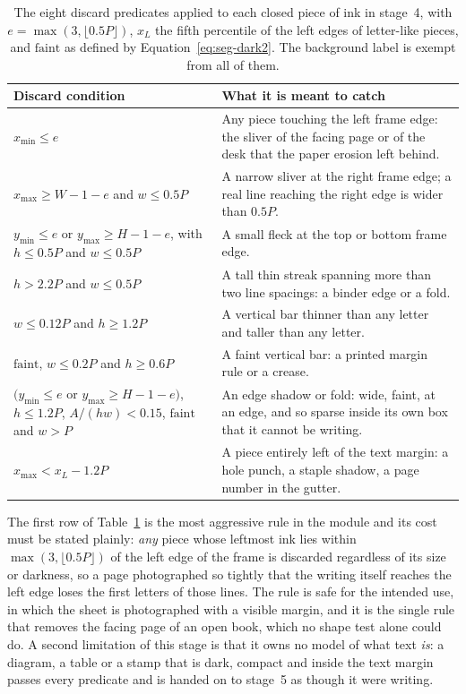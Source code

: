 \begin{table}[h]
\centering
\fontsize{9.5}{11.5}\selectfont
\begin{tabularx}{\linewidth}{|p{3.3cm}|X|}
\hline
\textbf{Discard condition} & \textbf{What it is meant to catch} \\
\hline
$x_{\min}\le e$ & Any piece touching the left frame edge: the sliver of the facing page or of the desk that the paper erosion left behind. \\
\hline
$x_{\max}\ge W-1-e$ and $w\le0.5P$ & A narrow sliver at the right frame edge; a real line reaching the right edge is wider than $0.5P$. \\
\hline
$y_{\min}\le e$ or $y_{\max}\ge H-1-e$, with $h\le0.5P$ and $w\le0.5P$ & A small fleck at the top or bottom frame edge. \\
\hline
$h>2.2P$ and $w\le0.5P$ & A tall thin streak spanning more than two line spacings: a binder edge or a fold. \\
\hline
$w\le0.12P$ and $h\ge1.2P$ & A vertical bar thinner than any letter and taller than any letter. \\
\hline
$\mathrm{faint}$, $w\le0.2P$ and $h\ge0.6P$ & A faint vertical bar: a printed margin rule or a crease. \\
\hline
$(y_{\min}\le e$ or $y_{\max}\ge H-1-e)$, $h\le1.2P$, $A/(hw)<0.15$, $\mathrm{faint}$ and $w>P$ & An edge shadow or fold: wide, faint, at an edge, and so sparse inside its own box that it cannot be writing. \\
\hline
$x_{\max}<x_L-1.2P$ & A piece entirely left of the text margin: a hole punch, a staple shadow, a page number in the gutter. \\
\hline
\end{tabularx}
\caption{The eight discard predicates applied to each closed piece of ink in stage~4, with $e=\max(3,\lfloor0.5P\rfloor)$, $x_L$ the fifth percentile of the left edges of letter-like pieces, and $\mathrm{faint}$ as defined by Equation~\ref{eq:seg-dark2}. The background label is exempt from all of them.}
\label{tab:seg-artifact}
\end{table}

The first row of Table~\ref{tab:seg-artifact} is the most aggressive rule in the module and its cost must be stated plainly: \emph{any} piece whose leftmost ink lies within $\max(3,\lfloor0.5P\rfloor)$ of the left edge of the frame is discarded regardless of its size or darkness, so a page photographed so tightly that the writing itself reaches the left edge loses the first letters of those lines.
The rule is safe for the intended use, in which the sheet is photographed with a visible margin, and it is the single rule that removes the facing page of an open book, which no shape test alone could do.
A second limitation of this stage is that it owns no model of what text \emph{is}: a diagram, a table or a stamp that is dark, compact and inside the text margin passes every predicate and is handed on to stage~5 as though it were writing.

